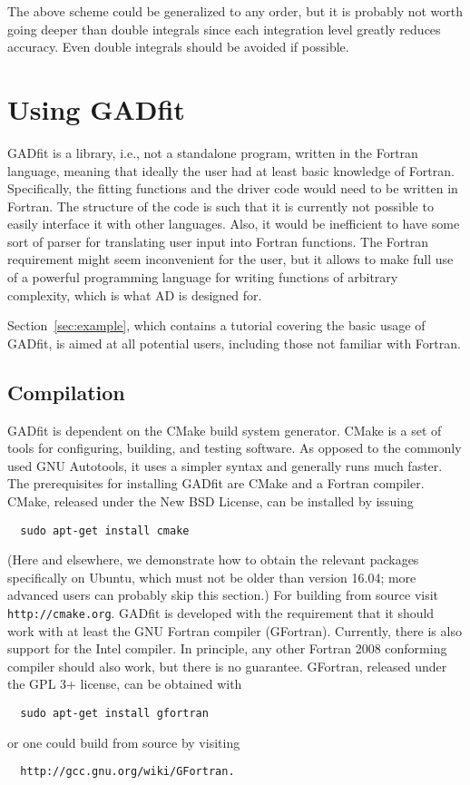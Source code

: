 \documentclass{article}
\begin{document}
The above scheme could be generalized to any order, but it is probably not worth going deeper than double integrals since each integration level greatly reduces accuracy. Even double integrals should be avoided if possible.

\section{Using GADfit}

GADfit is a library, i.e., not a standalone program, written in the Fortran language, meaning that ideally the user had at least basic knowledge of Fortran. Specifically, the fitting functions and the driver code would need to be written in Fortran. The structure of the code is such that it is currently not possible to easily interface it with other languages. Also, it would be inefficient to have some sort of parser for translating user input into Fortran functions. The Fortran requirement might seem inconvenient for the user, but it allows to make full use of a powerful programming language for writing functions of arbitrary complexity, which is what AD is designed for.

Section~\ref{sec:example}, which contains a tutorial covering the basic usage of GADfit, is aimed at all potential users, including those not familiar with Fortran.

\subsection{Compilation}

GADfit is dependent on the CMake build system generator. CMake is a set of tools for configuring, building, and testing software. As opposed to the commonly used GNU Autotools, it uses a simpler syntax and generally runs much faster. The prerequisites for installing GADfit are CMake and a Fortran compiler. CMake, released under the New BSD License, can be installed by issuing
\begin{verbatim}
  sudo apt-get install cmake
\end{verbatim}
(Here and elsewhere, we demonstrate how to obtain the relevant packages specifically on Ubuntu, which must not be older than version 16.04; more advanced users can probably skip this section.) For building from source visit \texttt{http://cmake.org}. GADfit is developed with the requirement that it should work with at least the GNU Fortran compiler (GFortran). Currently, there is also support for the Intel compiler. In principle, any other Fortran 2008 conforming compiler should also work, but there is no guarantee. GFortran, released under the GPL 3+ license, can be obtained with
\begin{verbatim}
  sudo apt-get install gfortran
\end{verbatim}
or one could build from source by visiting
\begin{verbatim}
  http://gcc.gnu.org/wiki/GFortran.
\end{verbatim}
\end{document}
